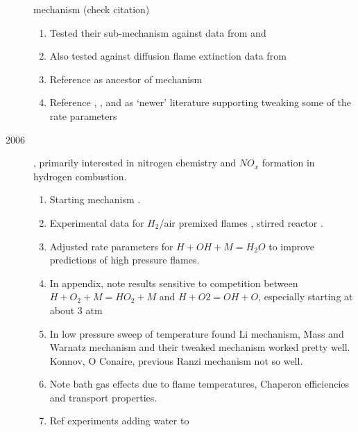 \documentclass[preprint,3p,times,twocolumn]{elsarticle}
\begin{document}
\begin{description}
              mechanism  \citet{PetrovaW06} (check citation)
                \begin{enumerate}
                    \item Tested their sub-mechanism against data from
                      \citet{TseZL00} and \citet{KwonF01}
                      \item Also tested against diffusion flame
                        extinction data from \citet{BalakrishnanTW94}
                    \item Reference \citet{BalakrishnanW94} as ancestor of mechanism
                    \item Reference \citet{LiZKD04}, \citet{ConaireCSPW04}, and
                      \citet{DavisJWE05} as `newer' literature supporting
                        tweaking some of the rate parameters
                \end{enumerate}
                \item[2006] \citet{FrassoldatiFR06}, primarily
                  interested in nitrogen chemistry and $NO_x$
                  formation in hydrogen combustion. 
                  \begin{enumerate}
                    \item Starting mechanism \citet{RanziFGF05}.
                    \item Experimental data for $H_2$/air premixed
                      flames \cite{HarringtonSBNJC96}, stirred
                      reactor \cite{XieHH96}. 
                  \item Adjusted rate parameters for $H + OH + M =
                    H_2O$ to improve predictions of high pressure
                    flames. 
                    \item In appendix, note results sensitive to
                      competition between $H + O_2 + M = HO_2 + M$ and
                      $H+O2 = OH + O$, especially starting at about 3
                      atm
                      \item In low pressure sweep of temperature found
                        Li mechanism, Mass and Warnatz mechanism and
                        their tweaked mechanism worked pretty
                        well. Konnov, O Conaire, previous Ranzi
                        mechanism not so well. 
                        \item Note bath gas effects due to flame
                          temperatures, Chaperon efficiencies and
                          transport properties.
                        \item Ref experiments adding water to

\end{enumerate}
\end{description}
\end{document}
